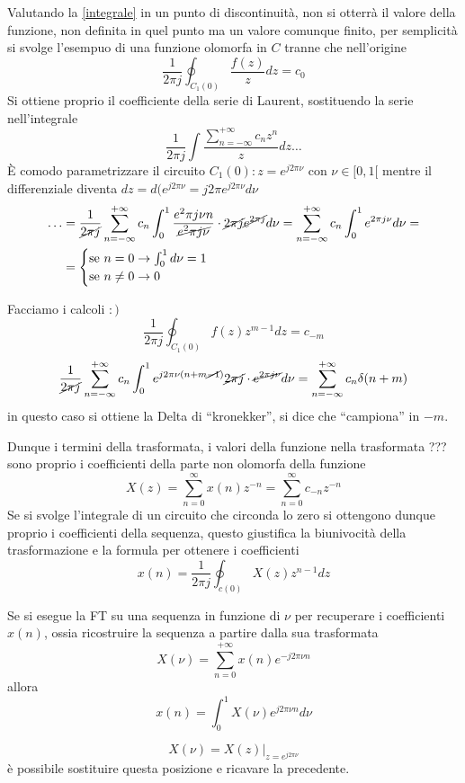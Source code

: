 Valutando la \ref{integrale} in un punto di discontinuità, non si otterrà il
valore della funzione, non definita in quel punto ma un valore comunque finito,
per semplicità si svolge l'esempuo di una funzione olomorfa in $C$ tranne che
nell'origine
$$
\frac{1}{2\pi j} \oint_{C_1(0)} \frac{f(z)}{z} dz = c_0
$$
Si ottiene proprio il coefficiente della serie di Laurent, sostituendo la serie
nell'integrale
$$
\frac{1}{2\pi j} \int \frac{\sum_{n=-\infty}^{+\infty} c_nz^n}{z}dz \dots
$$
È comodo parametrizzare il circuito $C_1(0): z=e^{j2\pi \nu}$ con $\nu\in [0,1[$
mentre il differenziale diventa $dz = d(e^{j2\pi \nu} = j2\pi e^{j2\pi \nu}
d\nu $
$$\begin{aligned}
\dots &= \frac{1}{\cancel{2\pi j}} \sum_{n=-\infty}^{+\infty} c_n \int_0^1
\frac{e^2\pi j\nu n}{\cancel{e^2\pi j \nu}} \cdot \cancel{2\pi
j}\cancel{e^{2\pi j }} d\nu = \sum_{n=-\infty}^{+\infty} c_n \int_0^1 e^{2\pi j
\nu} d\nu = \\
&= \begin{cases}
\text{se } n = 0 \rightarrow \int_0^1d\nu = 1 \\
\text{se } n\neq0 \rightarrow 0
\end{cases}
\end{aligned}
$$


Facciamo i calcoli $:)$
$$
\frac{1}{2\pi j} \oint_{C_1(0)} f(z) z^{m-1} dz = c_{-m}
$$
$$
\frac{1}{\cancel{2\pi j} } \sum_{n=-\infty}^{+\infty} c_n \int_0^1
e^{j2\pi\nu(n+m\cancel{-1})}\cancel{2\pi j}\cdot \cancel{e^{2\pi j \nu}}d\nu =
\sum_{n=-\infty}^{+\infty}c_n\delta(n+m)
$$
in questo caso si ottiene la Delta di ``kronekker'', si dice che ``campiona''
in $-m$.

Dunque i termini della trasformata, i valori della funzione nella trasformata
??? sono proprio i coefficienti della parte non olomorfa della funzione
$$
X(z) = \sum_{n=0}^{\infty} x(n)z^{-n} = \sum_{n=0}^{\infty} c_{-n}z^{-n}
$$
Se si svolge l'integrale di un circuito che circonda lo zero si ottengono
dunque proprio i coefficienti della sequenza, questo giustifica la biunivocità
della trasformazione e la formula per ottenere i coefficienti
$$
x(n) = \frac{1}{2\pi j} \oint_{c(0)} X(z)z^{n-1} dz
$$

Se si esegue la FT su una sequenza in funzione di $\nu$ per recuperare i
coefficienti $x(n)$, ossia ricostruire la sequenza a partire dalla sua
trasformata
$$
X(\nu) = \sum_{n=0}^{+\infty} x(n) e^{-j2\pi \nu n}
$$
allora
$$
x(n) = \int_0^1 X(\nu) e^{j2\pi \nu n} d\nu
$$

$$
X(\nu) = \left.X(z)\right|_{z=e^{j2\pi \nu}}
$$
è possibile sostituire questa posizione e ricavare la precedente.


